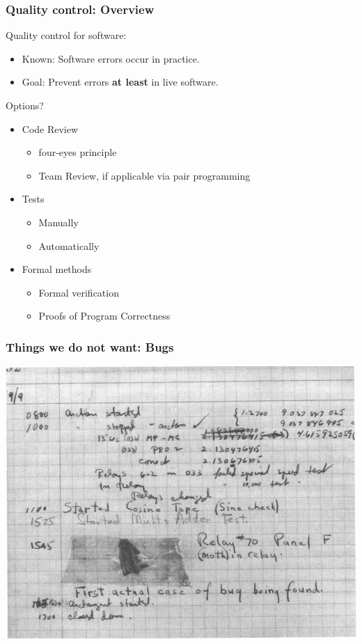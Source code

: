 
\begin{frame}
 \frametitle{Quality control: Overview}

Quality control for software:
\begin{itemize}
  \item Known: Software errors occur in practice.
  \item Goal: Prevent errors \textbf{at least} in live software.
\end{itemize}
Options?
 \pause
\begin{itemize}
  \item Code Review
   \begin{itemize}
    \item four-eyes principle
    \item Team Review, if applicable via pair programming
   \end{itemize} \pause
  \item Tests
   \begin{itemize}
    \item Manually
    \item Automatically
   \end{itemize} \pause
  \item Formal methods
   \begin{itemize}
    \item Formal verification
    \item Proofs of Program Correctness 
   \end{itemize}
\end{itemize}
\end{frame}


\begin{frame}
\frametitle{Things we do not want: Bugs}
  \begin{center}
  \includegraphics[width=.85\textwidth]{images/Qualitaetssicherung/abbildungen/Bug}
  \end{center}

\end{frame}

